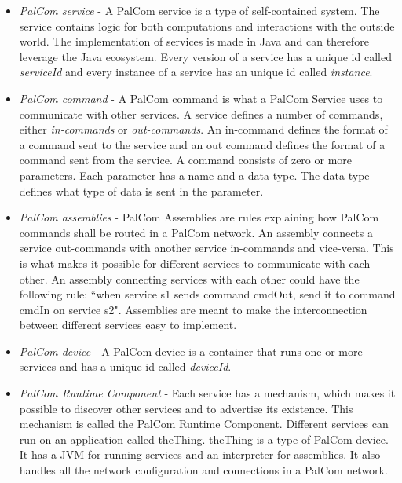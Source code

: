\documentclass{cslthse-msc}
\begin{document}
\begin{itemize}
\item \emph{PalCom service} - A PalCom service is a type of self-contained system. The service contains logic for both computations and interactions with the outside world. The implementation of services is made in Java and can therefore leverage the Java ecosystem. Every version of a service has a unique id called \emph{serviceId} and every instance of a service has an unique id called \emph{instance}. 


\item \emph{PalCom command} - A PalCom command is what a PalCom Service uses to communicate with other services. A service defines a number of commands, either \emph{in-commands} or \emph{out-commands}. An in-command defines the format of a command sent to the service and an out command defines the format of a command sent from the service. A command consists of zero or more parameters. Each parameter has a name and a data type. The data type defines what type of data is sent in the parameter. 

\item \emph{PalCom assemblies} - PalCom Assemblies are rules explaining how PalCom commands shall be routed in a PalCom network. An assembly connects a service out-commands with another service in-commands and vice-versa. This is what makes it possible for different services to communicate with each other. An assembly connecting services with each other could have the following rule:  “when service s1 sends command cmdOut, send it to command cmdIn on service s2". Assemblies are meant to make the interconnection between different services easy to implement.

\item \emph{PalCom device} - A PalCom device is a container that runs one or more services and has a unique id called \emph{deviceId}.

\item \emph{PalCom Runtime Component} - Each service has a mechanism, which makes it possible to discover other services and to advertise its existence. This mechanism is called the PalCom Runtime Component. Different services can run on an application called theThing. theThing is a type of PalCom device. It has a JVM for running services and an interpreter for assemblies. It also handles all the network configuration and connections in a PalCom network.

\end{itemize}
\end{document}
